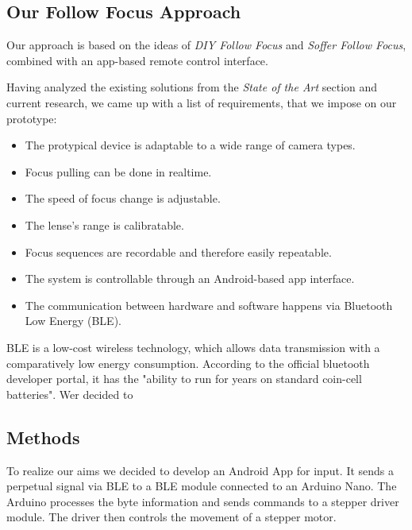 \documentclass{sigchi}
\begin{document}
\subsection{Our Follow Focus Approach}
Our approach is based on the ideas of \textit{DIY Follow Focus} \cite{diyff} and \textit{Soffer Follow Focus}, combined with an app-based remote control interface.

Having analyzed the existing solutions from the \textit{State of the Art} section and current research, we came up with a list of requirements, that we impose on our prototype:
\begin{itemize}
  \item The protypical device is adaptable to a wide range of camera types. 
  \item Focus pulling can be done in realtime.
  \item The speed of focus change is adjustable.
  \item The lense's range is calibratable.
  \item Focus sequences are recordable and therefore easily repeatable.
  \item The system is controllable through an Android-based app interface.
  \item The communication between hardware and software happens via Bluetooth Low Energy (BLE).
\end{itemize}

BLE is a low-cost wireless technology, which allows data transmission with a comparatively low energy consumption. According to the official bluetooth developer portal, it has the "ability to run for years on standard coin-cell batteries". \cite{ble} Wer decided to 

\subsection{Methods}
To realize our aims we decided to develop an Android App for input. It sends a perpetual signal via BLE to a BLE module connected to an Arduino Nano. The Arduino processes the byte information and sends commands to a stepper driver module. The driver then controls the movement of a stepper motor. 
\end{document}
